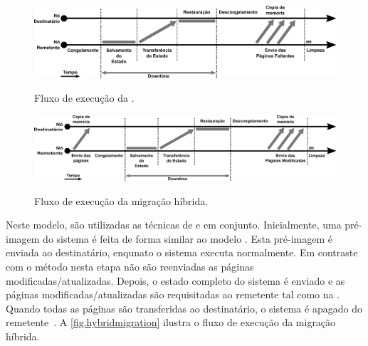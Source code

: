 \begin{figure}[bt]
    \centering
    \caption{Fluxo de execução da \postcopymigration.}
    \includegraphics[width=0.8\linewidth]{content/images/post-copy-migration-flow.pdf}
    \label{fig.postcopy}
\end{figure}

\begin{figure}[b]
    \centering
    \caption{Fluxo de execução da migração híbrida.}
    \includegraphics[width=0.8\linewidth]{content/images/hybrid-migration-flow.pdf}
    \label{fig.hybridmigration}
\end{figure}

\label{sec.hybridmigration}
Neste modelo, são utilizadas as técnicas de \precopy e \postcopy em conjunto. Inicialmente, uma pré-imagem do sistema é feita de forma similar ao modelo \precopymigration. Esta pré-imagem é enviada ao destinatário, enqunato o sistema executa normalmente. Em contraste com o método \precopy nesta etapa não são reenviadas as páginas modificadas/atualizadas. Depois, o estado completo do sistema é enviado e as páginas modificadas/atualizadas são requisitadas ao remetente tal como na \postcopymigration. Quando todas as páginas são transferidas ao destinatário, o sistema é apagado do remetente~\cite{singh2022predictive, imran2022live}. A \autoref{fig.hybridmigration} ilustra o fluxo de execução da migração híbrida.




